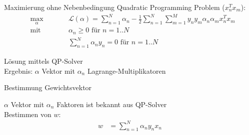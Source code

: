 \documentclass[ngerman]{beamer}
\newcommand{\Lagr}{\mathcal{L}}
\begin{document}
\begin{frame}{Maximierung ohne Nebenbedingung}
	Quadratic Programming Problem ($x_{n}^{T} x_{m}$):
	\begin{subequations}
		\begin{alignat*}{2}
			&\!\max_{\alpha}        &\qquad&  	\Lagr(\alpha) = \sum_{n=1}^{N} \alpha_{n} - \frac{1}{2} \sum_{n=1}^{N} \sum_{m=1}^{M} y_{n} y_{m} \alpha_{n} \alpha_{m} x_{n}^{T} x_{m}\\
			&\text{mit } &      & \alpha_{n} \geq 0 \text{ für } n=1..N \\
			&       & & \sum_{n=1}^{N} \alpha_{n} y_{n} = 0\text{ für } n=1..N
		\end{alignat*}
	\end{subequations}

	Lösung mittels QP-Solver \\
	Ergebnis: $\alpha$ Vektor mit $\alpha_{n}$ Lagrange-Multiplikatoren

\end{frame}

\begin{frame}{Bestimmung Gewichtsvektor}
	
	$\alpha$ Vektor mit $\alpha_{n}$ Faktoren ist bekannt aus QP-Solver\\
	
	Bestimmen von $w$:
	\begin{equation*}
		\begin{aligned}
			w &= \sum_{n=1}^{N} \alpha_{n} y_{n} x_{n}
		\end{aligned}
	\end{equation*}
\end{frame}
\end{document}
